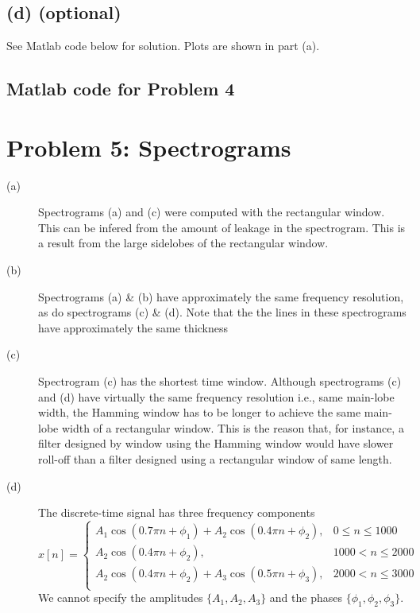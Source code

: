 \documentclass{article}
\begin{document}
\subsection{(d) (optional)}

See Matlab code below for solution. Plots are shown in part (a).

\subsection{Matlab code for Problem 4}



\section{Problem 5: Spectrograms}
\begin{description}
	\item[(a)] Spectrograms (a) and (c) were computed with the rectangular window. This can be infered from the amount of leakage in the spectrogram. This is a result from the large sidelobes of the rectangular window.
	\item[(b)] Spectrograms (a) \& (b) have approximately the same frequency resolution, as do spectrograms (c) \& (d). Note that the the lines in these spectrograms have approximately the same thickness
	\item[(c)] Spectrogram (c) has the shortest time window. Although spectrograms (c) and (d) have virtually the same frequency resolution i.e., same main-lobe width, the Hamming window has to be longer to achieve the same main-lobe width of a rectangular window. This is the reason that, for instance, a filter designed by window using the Hamming window would have slower roll-off than a filter designed using a rectangular window of same length.
	\item[(d)] 
	The discrete-time signal has three frequency components
	\begin{equation}
		x[n] = \begin{cases}
		A_1\cos(0.7\pi n + \phi_1) + A_2\cos(0.4\pi n + \phi_2), & 0 \leq n \leq 1000 \\
		A_2\cos(0.4\pi n + \phi_2), & 1000 < n \leq 2000 \\
		A_2\cos(0.4\pi n + \phi_2) + A_3\cos(0.5\pi n + \phi_3), & 2000 < n \leq 3000 \\
		\end{cases}
	\end{equation}
	We cannot specify the amplitudes $\{A_1, A_2, A_3\}$ and the phases $\{\phi_1, \phi_2, \phi_3\}$.
	

\end{description}
\end{document}

